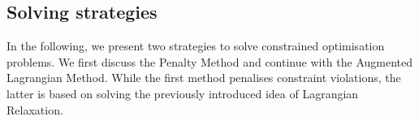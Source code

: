 
\subsection{Solving strategies}
\label{ssec:copt_solv}
In the following, we present two strategies to solve constrained optimisation problems. We first discuss the Penalty Method and continue with the Augmented Lagrangian Method. While the first method penalises constraint violations, the latter is based on solving the previously introduced idea of Lagrangian Relaxation.
